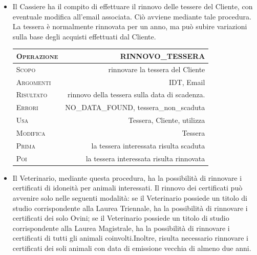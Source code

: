 \documentclass[12pt]{report}
\begin{document}
\begin{itemize}
\item {Il Cassiere ha il compito di effettuare il rinnovo delle tessere del Cliente, con eventuale modifica all'email associata. Ciò avviene mediante tale procedura. La tessera è normalmente rinnovata per un anno, ma può subire variazioni sulla base degli acquisti effettuati dal Cliente.}

\begin{center}
 \begin{tabular}{l | r} 
 \textsc{Operazione} & RINNOVO\_TESSERA \\ [0.5ex] 
 \hline
 \textsc{Scopo} & rinnovare la tessera del Cliente \\ 
 \textsc{Argomenti} & IDT, Email   \\
 \textsc{Risultato} & rinnovo della tessera sulla data di scadenza.\\
 \textsc{Errori}& NO\_DATA\_FOUND, tessera\_non\_scaduta\\
 \textsc{Usa} & Tessera, Cliente, utilizza  \\ 
 \textsc{Modifica} & Tessera\\ 
 \textsc{Prima} & la tessera interessata risulta scaduta\\ 
 \textsc{Poi} & la tessera interessata risulta rinnovata\\ [1ex] 
\end{tabular}
\end{center}

\item {Il Veterinario, mediante questa procedura, ha la possibilità di rinnovare i certificati di idoneità per animali interessati. Il rinnovo dei certificati può avvenire solo nelle seguenti modalità: se il Veterinario possiede un titolo di studio corrispondente alla Laurea Triennale, ha la possibilità di rinnovare i certificati dei solo Ovini; se il Veterinario possiede un titolo di studio corrispondente alla  Laurea  Magistrale,  ha  la  possibilità  di  rinnovare  i  certificati  di  tutti  gli  animali  coinvolti.Inoltre, risulta necessario rinnovare i certificati dei soli animali con data di emissione vecchia di almeno due anni.}


\end{itemize}
\end{document}
